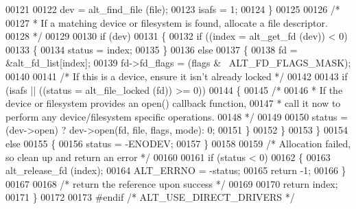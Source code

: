 \begin{DoxyCode}
00121 
00122     dev   = alt_find_file (file);
00123     isafs = 1;
00124   \}
00125 
00126   \textcolor{comment}{/* }
00127 \textcolor{comment}{   * If a matching device or filesystem is found, allocate a file descriptor. }
00128 \textcolor{comment}{   */}
00129 
00130   \textcolor{keywordflow}{if} (dev)
00131   \{
00132     \textcolor{keywordflow}{if} ((index = alt_get_fd (dev)) < 0)
00133     \{
00134       status = index;
00135     \}
00136     \textcolor{keywordflow}{else}
00137     \{
00138       fd = &alt_fd_list[index];
00139       fd->fd_flags = (flags & ~ALT_FD_FLAGS_MASK);
00140       
00141       \textcolor{comment}{/* If this is a device, ensure it isn't already locked */}
00142 
00143       \textcolor{keywordflow}{if} (isafs || ((status = alt_file_locked (fd)) >= 0))
00144       \{
00145         \textcolor{comment}{/* }
00146 \textcolor{comment}{         * If the device or filesystem provides an open() callback function,}
00147 \textcolor{comment}{         * call it now to perform any device/filesystem specific operations.}
00148 \textcolor{comment}{         */}
00149     
00150         status = (dev->open) ? dev->open(fd, file, flags, mode): 0;
00151       \}
00152     \}
00153   \}
00154   \textcolor{keywordflow}{else}
00155   \{
00156     status = -ENODEV;
00157   \}
00158 
00159   \textcolor{comment}{/* Allocation failed, so clean up and return an error */} 
00160 
00161   \textcolor{keywordflow}{if} (status < 0)
00162   \{
00163     alt_release_fd (index);  
00164     ALT_ERRNO = -status;
00165     \textcolor{keywordflow}{return} -1;
00166   \}
00167   
00168   \textcolor{comment}{/* return the reference upon success */}
00169 
00170   \textcolor{keywordflow}{return} index;
00171 \}
00172 
00173 \textcolor{preprocessor}{#endif }\textcolor{comment}{/* ALT\_USE\_DIRECT\_DRIVERS */}\textcolor{preprocessor}{}
\end{DoxyCode}
